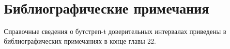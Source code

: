 \section{Библиографические примечания}
Справочные сведения о бутстреп-t доверительных интервалах приведены в библиографических примечаниях в конце главы 22.


